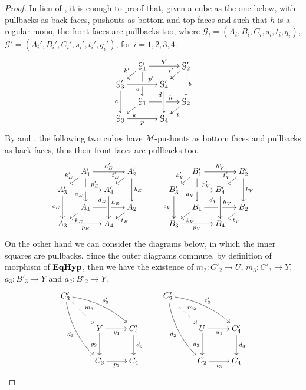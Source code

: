 \documentclass[a4paper,UKenglish,cleveref,pdftex,thm-restate,numberwithinsect]{lipics-v2021}
\def\B{\textbf {\textup{B}}}
\def\A{\textbf {\textup{A}}}
\newcommand{\catname}[1]{\textbf{\textup{#1}}}
\newcommand{\EqHyp}{\catname{EqHyp}} %
\begin{document}
\begin{proof}
	In lieu of , it is enough to proof that, given a cube as the one below, with pullbacks as back faces, pushouts as bottom and top faces and such that $h$ is a regular mono,
	the front faces are pullbacks too, where $\mathcal{G}_i = (A_i, B_i, C_i, s_i, t_i, q_i)$, $\mathcal{G}'=(A_i', B_i', C_i', s_i', t_i', q_i')$, for $i = 1, 2, 3, 4$.
	\[
	\xymatrix@C=10pt@R=6pt{&\mathcal{G}_1'\ar[dd]|\hole_(.65){a}\ar[rr]^{h'} \ar[dl]_{k'} && \mathcal{G}_2' \ar[dd]^{b} \ar[dl]_{t'} \\ \mathcal{G}_3'  \ar[dd]_{c}\ar[rr]^(.7){p'} & & \mathcal{G}_4' \ar[dd]_(.3){d}\\&\mathcal{G}_1\ar[rr]|\hole^(.65){h} \ar[dl]^{k} && \mathcal{G}_2 \ar[dl]^{t} \\\mathcal{G}_3 \ar[rr]_{p} & & \mathcal{G}_4 }
	\]
	By  and , the following two cubes have $\mathcal{M}$-pushouts as bottom faces and pullbacks as back faces,
	thus their front faces are pullbacks too.
	\[
	\xymatrix@C=10pt@R=6pt{&A_1'\ar[dd]|\hole_(.65){a_E}\ar[rr]^{h_E'} \ar[dl]_{k_E'} && A_2' \ar[dd]^{b_E} \ar[dl]_{t_E'} \\ A_3'  \ar[dd]_{c_E}\ar[rr]^(.7){p_E'} & & A_4' \ar[dd]_(.3){d_E}\\&A_1\ar[rr]|\hole^(.65){h_E} \ar[dl]^{k_E} && A_2 \ar[dl]^{t_E} \\A_3 \ar[rr]_{p_E} & & A_4 }
	\qquad
	\xymatrix@C=10pt@R=6pt{&B_1'\ar[dd]|\hole_(.65){a_V}\ar[rr]^{h_V'} \ar[dl]_{k_V'} && B_2' \ar[dd]^{b_V} \ar[dl]_{t_V'} \\ B_3'  \ar[dd]_{c_V}\ar[rr]^(.7){p_V'} & & B_4' \ar[dd]_(.3){d_V}\\&B_1\ar[rr]|\hole^(.65){h_V} \ar[dl]^{k_V} && B_2 \ar[dl]^{t_V} \\B_3 \ar[rr]_{p_V} & & B_4 }
	\]
	On the other hand we can consider the diagrams below, in which the inner squares are pullbacks.
	Since the outer diagrams commute, by definition of morphism of $\EqHyp$, then we have the existence of $m_2\colon C'_2\to U$, $m_3\colon C'_3\to Y $, $a_3\colon B'_3\to Y$ and $a_2\colon B'_2\to Y$.
	\[\xymatrix{C'_3 \ar@{.>}[dr]^{m_3} \ar@/^.3cm/[drr]^{p'_3} \ar@/_.3cm/[ddr]_{d_3} &&& C'_2 \ar@{.>}[dr]^{m_2} \ar@/^.3cm/[drr]^{t'_3} \ar@/_.3cm/[ddr]_{d_2}\\&Y \ar[r]_{y_1} \ar[d]_{y_2}& C'_4\ar[d]^{d_3}&& U \ar[d]_{u_2}\ar[r]_{u_1}& C'_4 \ar[d]^{d_3}\\&C_3 \ar[r]_{p_3}& C_4 &&C_2 \ar[r]_{t_3}& C_4 }\]
	

\end{proof}
\end{document}
